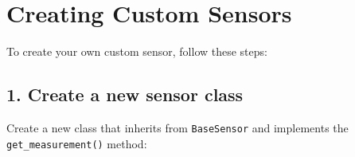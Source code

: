 \documentclass[
  letterpaper,
  DIV=11,
  numbers=noendperiod]{scrreprt}
\begin{document}
\section*{Creating Custom Sensors}\label{creating-custom-sensors}


To create your own custom sensor, follow these steps:

\subsection*{1. Create a new sensor
class}\label{create-a-new-sensor-class}

Create a new class that inherits from \texttt{BaseSensor} and implements
the \texttt{get\_measurement()} method:
\end{document}
